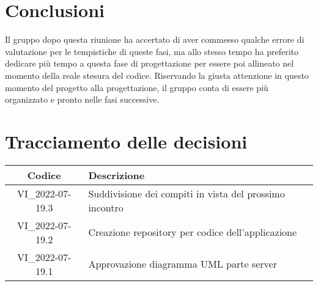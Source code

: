 \section{Conclusioni}
Il gruppo dopo questa riunione ha accertato di aver commesso qualche errore di valutazione per le tempistiche di queste fasi, ma allo stesso tempo ha preferito dedicare più tempo a questa fase di progettazione per essere poi allineato nel momento della reale stesura del codice. Riservando la giusta attenzione in questo momento del progetto alla progettazione, il gruppo conta di essere più organizzato e pronto nelle fasi successive.
\newpage

\section*{Tracciamento delle decisioni}
	\renewcommand{\arraystretch}{1.8} %
	\begin{tabular}{ |c|l| }
		\hline
		\textbf{Codice} & \textbf{Descrizione} \\
		\hline
		VI\_2022-07-19.3 & Suddivisione dei compiti in vista del prossimo incontro \\
		VI\_2022-07-19.2 & Creazione repository per codice dell'applicazione \\
		VI\_2022-07-19.1 & Approvazione diagramma UML parte server \\
		\hline
	\end{tabular}
